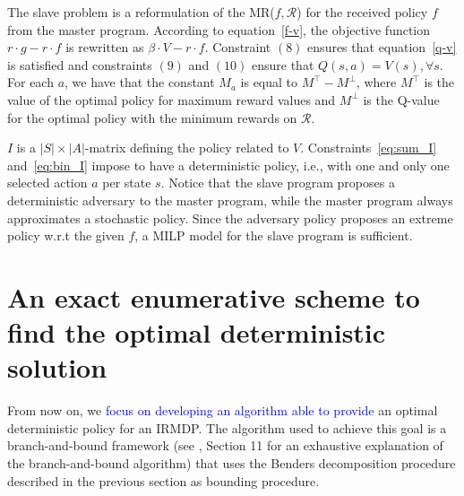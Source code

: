 \documentclass[sigconf]{aamas}  %
\newcommand{\ET}[1]{{\textcolor{blue}{#1}}}
\begin{document}
The slave problem is a reformulation of the MR($f, \mathcal{R}$) for the received policy $f$ from the master program. According to equation~\eqref{f-v}, the objective function $r \cdot g - r \cdot f$ is rewritten as $\beta \cdot V - r \cdot f$. 
% 
Constraint $(8)$ ensures that equation~\eqref{q-v} is satisfied and 
%
constraints $(9)$ and $(10)$ ensure that $Q(s, a) = V(s), \forall s $.
For each $a$, we have that the constant $M_a$ is equal to  $M^{\top} - M^{\perp}$, where  $M^{\top}$ is the value of the optimal policy for maximum reward values 
and $M^{\perp}$ is the Q-value for the optimal policy with the minimum rewards on $\mathcal{R}$. 

$I$ is a $|S|\times|A|$-matrix defining the policy related to $V$. 
Constraints~\eqref{eq:sum_I} and~\eqref{eq:bin_I} impose to  have a deterministic policy, i.e., with one and only one selected action $a$ per state $s$. Notice that the slave program proposes a deterministic adversary to the master program, while the master program always approximates a stochastic policy. Since the adversary policy proposes an extreme policy w.r.t the given $f$, a MILP model for the slave program is sufficient.   


\section{An exact enumerative scheme to find the optimal deterministic solution}\label{sec:bb} 

From now on, we \ET{focus on developing an algorithm able to provide} an optimal deterministic policy for an IRMDP.
The algorithm used to achieve this goal is a branch-and-bound framework (see \cite{bertsimas2005optimization}, Section 11 for an exhaustive explanation of the branch-and-bound algorithm) that uses the Benders decomposition procedure described in the previous section as bounding procedure. 
\end{document}
